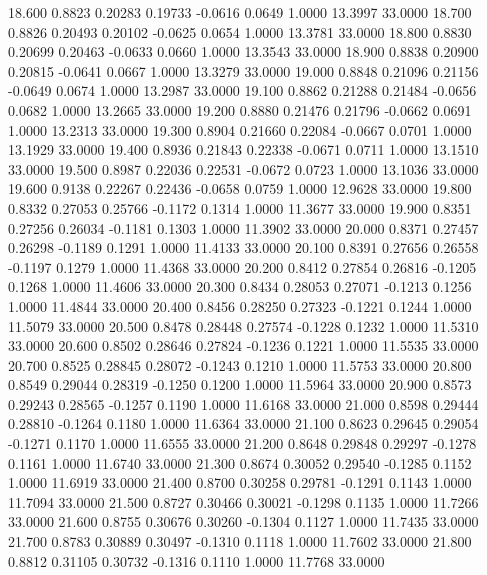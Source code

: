   18.600   0.8823   0.20283   0.19733  -0.0616   0.0649   1.0000  13.3997  33.0000
  18.700   0.8826   0.20493   0.20102  -0.0625   0.0654   1.0000  13.3781  33.0000
  18.800   0.8830   0.20699   0.20463  -0.0633   0.0660   1.0000  13.3543  33.0000
  18.900   0.8838   0.20900   0.20815  -0.0641   0.0667   1.0000  13.3279  33.0000
  19.000   0.8848   0.21096   0.21156  -0.0649   0.0674   1.0000  13.2987  33.0000
  19.100   0.8862   0.21288   0.21484  -0.0656   0.0682   1.0000  13.2665  33.0000
  19.200   0.8880   0.21476   0.21796  -0.0662   0.0691   1.0000  13.2313  33.0000
  19.300   0.8904   0.21660   0.22084  -0.0667   0.0701   1.0000  13.1929  33.0000
  19.400   0.8936   0.21843   0.22338  -0.0671   0.0711   1.0000  13.1510  33.0000
  19.500   0.8987   0.22036   0.22531  -0.0672   0.0723   1.0000  13.1036  33.0000
  19.600   0.9138   0.22267   0.22436  -0.0658   0.0759   1.0000  12.9628  33.0000
  19.800   0.8332   0.27053   0.25766  -0.1172   0.1314   1.0000  11.3677  33.0000
  19.900   0.8351   0.27256   0.26034  -0.1181   0.1303   1.0000  11.3902  33.0000
  20.000   0.8371   0.27457   0.26298  -0.1189   0.1291   1.0000  11.4133  33.0000
  20.100   0.8391   0.27656   0.26558  -0.1197   0.1279   1.0000  11.4368  33.0000
  20.200   0.8412   0.27854   0.26816  -0.1205   0.1268   1.0000  11.4606  33.0000
  20.300   0.8434   0.28053   0.27071  -0.1213   0.1256   1.0000  11.4844  33.0000
  20.400   0.8456   0.28250   0.27323  -0.1221   0.1244   1.0000  11.5079  33.0000
  20.500   0.8478   0.28448   0.27574  -0.1228   0.1232   1.0000  11.5310  33.0000
  20.600   0.8502   0.28646   0.27824  -0.1236   0.1221   1.0000  11.5535  33.0000
  20.700   0.8525   0.28845   0.28072  -0.1243   0.1210   1.0000  11.5753  33.0000
  20.800   0.8549   0.29044   0.28319  -0.1250   0.1200   1.0000  11.5964  33.0000
  20.900   0.8573   0.29243   0.28565  -0.1257   0.1190   1.0000  11.6168  33.0000
  21.000   0.8598   0.29444   0.28810  -0.1264   0.1180   1.0000  11.6364  33.0000
  21.100   0.8623   0.29645   0.29054  -0.1271   0.1170   1.0000  11.6555  33.0000
  21.200   0.8648   0.29848   0.29297  -0.1278   0.1161   1.0000  11.6740  33.0000
  21.300   0.8674   0.30052   0.29540  -0.1285   0.1152   1.0000  11.6919  33.0000
  21.400   0.8700   0.30258   0.29781  -0.1291   0.1143   1.0000  11.7094  33.0000
  21.500   0.8727   0.30466   0.30021  -0.1298   0.1135   1.0000  11.7266  33.0000
  21.600   0.8755   0.30676   0.30260  -0.1304   0.1127   1.0000  11.7435  33.0000
  21.700   0.8783   0.30889   0.30497  -0.1310   0.1118   1.0000  11.7602  33.0000
  21.800   0.8812   0.31105   0.30732  -0.1316   0.1110   1.0000  11.7768  33.0000
